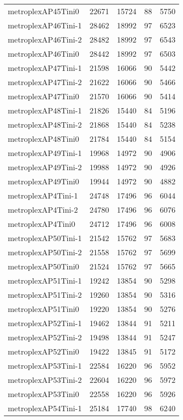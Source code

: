 \begin{longtable}{lrrrr}
metroplexAP45Tini0 & 22671 & 15724 & 88 & 5750 \\
metroplexAP46Tini-1 & 28462 & 18992 & 97 & 6523 \\
metroplexAP46Tini-2 & 28482 & 18992 & 97 & 6543 \\
metroplexAP46Tini0 & 28442 & 18992 & 97 & 6503 \\
metroplexAP47Tini-1 & 21598 & 16066 & 90 & 5442 \\
metroplexAP47Tini-2 & 21622 & 16066 & 90 & 5466 \\
metroplexAP47Tini0 & 21570 & 16066 & 90 & 5414 \\
metroplexAP48Tini-1 & 21826 & 15440 & 84 & 5196 \\
metroplexAP48Tini-2 & 21868 & 15440 & 84 & 5238 \\
metroplexAP48Tini0 & 21784 & 15440 & 84 & 5154 \\
metroplexAP49Tini-1 & 19968 & 14972 & 90 & 4906 \\
metroplexAP49Tini-2 & 19988 & 14972 & 90 & 4926 \\
metroplexAP49Tini0 & 19944 & 14972 & 90 & 4882 \\
metroplexAP4Tini-1 & 24748 & 17496 & 96 & 6044 \\
metroplexAP4Tini-2 & 24780 & 17496 & 96 & 6076 \\
metroplexAP4Tini0 & 24712 & 17496 & 96 & 6008 \\
metroplexAP50Tini-1 & 21542 & 15762 & 97 & 5683 \\
metroplexAP50Tini-2 & 21558 & 15762 & 97 & 5699 \\
metroplexAP50Tini0 & 21524 & 15762 & 97 & 5665 \\
metroplexAP51Tini-1 & 19242 & 13854 & 90 & 5298 \\
metroplexAP51Tini-2 & 19260 & 13854 & 90 & 5316 \\
metroplexAP51Tini0 & 19220 & 13854 & 90 & 5276 \\
metroplexAP52Tini-1 & 19462 & 13844 & 91 & 5211 \\
metroplexAP52Tini-2 & 19498 & 13844 & 91 & 5247 \\
metroplexAP52Tini0 & 19422 & 13845 & 91 & 5172 \\
metroplexAP53Tini-1 & 22584 & 16220 & 96 & 5952 \\
metroplexAP53Tini-2 & 22604 & 16220 & 96 & 5972 \\
metroplexAP53Tini0 & 22558 & 16220 & 96 & 5926 \\
metroplexAP54Tini-1 & 25184 & 17740 & 98 & 6240 \\

\end{longtable}
